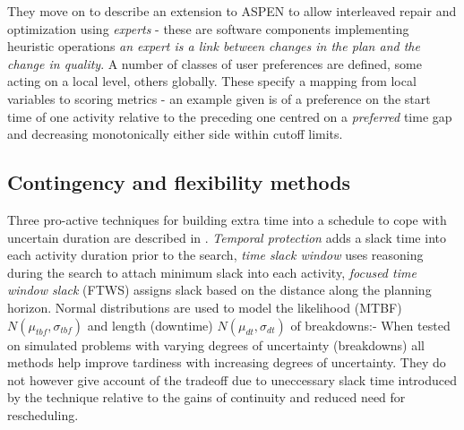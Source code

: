 \documentclass[12pt,a4paper]{article}
\begin{document}
They move on to describe an extension to ASPEN \citep{rabideau00generic} to allow interleaved repair and optimization using \emph{experts} - these are software components implementing heuristic operations \emph{an expert is a link between changes in the plan and the change in quality}. A number of classes of user preferences are defined, some acting on a local level, others globally. These specify a mapping from local variables to scoring metrics - an example given is of a preference on the start time of one activity relative to the preceding one centred on a \emph{preferred} time gap and decreasing monotonically either side within cutoff limits.

\subsection{Contingency and flexibility methods}
\label{subsect:flexible}





Three pro-active techniques for building extra time into a schedule to cope with uncertain duration are described in \citep{davenport01slack}. \emph{Temporal protection} adds a slack time into each activity duration prior to the search, \emph{time slack window} uses reasoning during the search to attach minimum slack into each activity, \emph{focused time window slack} (FTWS) assigns slack based on the distance along the planning horizon. Normal distributions  are used to model the likelihood (MTBF) $N(\mu_{tbf}, \sigma_{tbf})$ and length (downtime) $N(\mu_{dt}, \sigma_{dt})$ of breakdowns:-
When tested on simulated problems with varying degrees of uncertainty (breakdowns) all methods help improve tardiness with increasing degrees of uncertainty. They do not however give account of the tradeoff due to uneccessary slack time introduced by the technique relative to the gains of continuity and reduced need for rescheduling.
\end{document}
